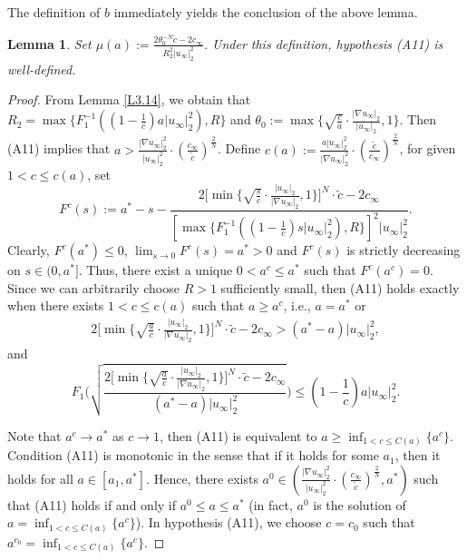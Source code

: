 \documentclass[10pt,a4paper]{amsart}
\numberwithin{equation}{section}
\newtheorem{lemma}[theorem]{Lemma}
\begin{document}
The definition of $b$ immediately yields the conclusion of the above lemma.

\begin{lemma}\label{L3.17} 
Set $\mu(a):=\frac{2\theta^{-N}_0\tilde{c}-2c_\infty}{R^2_2|u_\infty|^2_2}$. 
Under this definition, hypothesis {\rm (A11)} is well-defined.
\end{lemma}

\begin{proof}
From Lemma \ref{L3.14}, we obtain that  
$R_2=\max\{F_1^{-1}((1-\frac{1}{c})a|u_\infty|^2_2), R\}$ and 
$\theta_0:=\max\{\sqrt{\frac{c}{a}}\cdot\frac{|\nabla u_\infty|_2}{|u_\infty|_2},1\}$.
Then (A11) implies that 
$a> \frac{|\nabla u_\infty|^2_2}{|u_\infty|^2_2}\cdot(\frac{c_\infty}{\tilde{c}})^{\frac{2}{N}}$. 
Define $c(a):=\frac{a| u_\infty|^2_2}{|\nabla u_\infty|^2_2}
\cdot(\frac{\tilde{c}}{c_\infty})^{\frac{2}{N}}$, 
for given $1<c\leq c(a)$, set
$$
F^c(s):=a^*-s-\frac{2{[\min\{\sqrt{\frac{s}{c}}\cdot\frac{| u_\infty|_2}{|\nabla u_\infty|_2},1\}}]^N\cdot\tilde{c}-2c_\infty}{[\max\{F_1^{-1}((1-\frac{1}{c})s|u_\infty|^2_2),R\}]^2
|u_\infty|^2_2}.
$$
Clearly, $F^c(a^*)\leq0$, $\lim_{s\to0}F^c(s)=a^*>0$ and $F^c(s)$ is strictly decreasing 
on $s\in(0,a^*]$. Thus, there exist a unique $0<a^c\leq a^*$ such that $F^c(a^c)=0$. 
Since we can arbitrarily  choose $R>1$ sufficiently
small, then (A11) holds exactly when there exists $1<c\leq c(a)$ such that 
$a\geq a^c$, i.e., $ a=a^*$ or 
\begin{align*} 
2{[\min\{\sqrt{\frac{a}{c}}\cdot\frac{| u_\infty|_2}{|\nabla u_\infty|_2},1\}}]^N\cdot\tilde{c}-2c_\infty>(a^*-a)|u_\infty|^2_2,
\end{align*} 
and 
$$
F_1\bigg(\sqrt{\frac{2{[\min\{\sqrt{\frac{a}{c}}\cdot\frac{| u_\infty|_2}{|\nabla u_\infty|_2},1\}}]^N\cdot\tilde{c}-2c_\infty}{(a^*-a)|u_\infty|^2_2}}\bigg)\leq(1-\frac{1}{c})a|u_\infty|^2_2.
$$

Note that $a^c\to a^*$ as $c\to1$, then (A11) is equivalent to $a\geq \inf_{1<c\leq C(a)}\{a^c\}$. 
Condition (A11) is monotonic in the sense that if it holds for some $a_1$, then it holds for all $a\in[a_1, a^*]$. Hence, there exists 
$a^0\in(\frac{|\nabla u_\infty|^2_2}{|u_\infty|^2_2}\cdot(\frac{c_\infty}{\tilde{c}})^{\frac{2}{N}}, a^*)$ 
such that (A11) holds if and only if $a^0\leq a\leq a^*$ (in fact, $a^0$ is the solution of 
$a=\inf_{1<c\leq C(a)}\{a^c\}$). In hypothesis (A11), we  choose $c=c_0$ such that 
$a^{c_0}=\inf_{1<c\leq C(a)}\{a^c\}$.
\end{proof}
\end{document}
